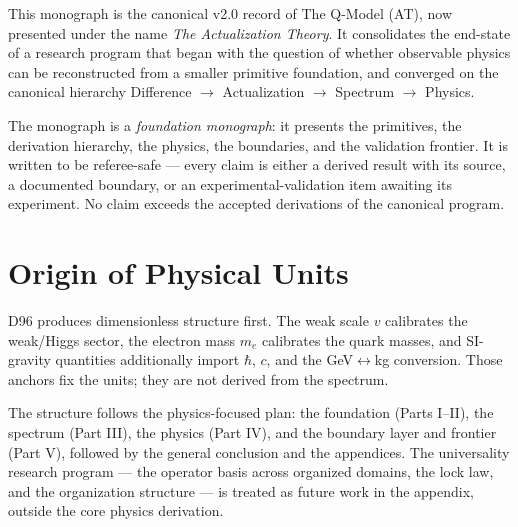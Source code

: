 This monograph is the canonical v2.0 record of The Q-Model (AT), now presented under the
name \emph{The Actualization Theory}. It consolidates the end-state of a research program
that began with the question of whether observable physics can be reconstructed from a
smaller primitive foundation, and converged on the canonical hierarchy
Difference $\to$ Actualization $\to$ Spectrum $\to$ Physics.

The monograph is a \emph{foundation monograph}: it presents the primitives, the derivation
hierarchy, the physics, the boundaries, and the validation frontier. It is written to be
referee-safe --- every claim is either a derived result with its source, a documented
boundary, or an experimental-validation item awaiting its experiment. No claim exceeds the
accepted derivations of the canonical program.

\section*{Origin of Physical Units}
\label{fm:abs:units}

D96 produces dimensionless structure first. The weak scale $v$ calibrates the weak/Higgs
sector, the electron mass $m_e$ calibrates the quark masses, and SI-gravity quantities
additionally import $\hbar$, $c$, and the GeV$\leftrightarrow$kg conversion. Those anchors
fix the units; they are not derived from the spectrum.

The structure follows the physics-focused plan: the foundation (Parts I--II), the spectrum
(Part III), the physics (Part IV), and the boundary layer and frontier (Part V), followed
by the general conclusion and the appendices. The universality research program --- the
operator basis across organized domains, the lock law, and the organization structure ---
is treated as future work in the appendix, outside the core physics derivation.

\tableofcontents
\clearpage
